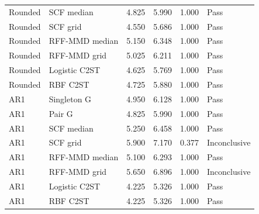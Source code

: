 {\begin{table}[t]
\begin{tabular}{llrrrl}
Rounded & SCF median & 4.825 & 5.990 & 1.000 & Pass \\
Rounded & SCF grid & 4.550 & 5.686 & 1.000 & Pass \\
Rounded & RFF-MMD median & 5.150 & 6.348 & 1.000 & Pass \\
Rounded & RFF-MMD grid & 5.025 & 6.211 & 1.000 & Pass \\
Rounded & Logistic C2ST & 4.625 & 5.769 & 1.000 & Pass \\
Rounded & RBF C2ST & 4.725 & 5.880 & 1.000 & Pass \\
AR1 & Singleton G & 4.950 & 6.128 & 1.000 & Pass \\
AR1 & Pair G & 4.825 & 5.990 & 1.000 & Pass \\
AR1 & SCF median & 5.250 & 6.458 & 1.000 & Pass \\
AR1 & SCF grid & 5.900 & 7.170 & 0.377 & Inconclusive \\
AR1 & RFF-MMD median & 5.100 & 6.293 & 1.000 & Pass \\
AR1 & RFF-MMD grid & 5.650 & 6.896 & 1.000 & Inconclusive \\
AR1 & Logistic C2ST & 4.225 & 5.326 & 1.000 & Pass \\
AR1 & RBF C2ST & 4.225 & 5.326 & 1.000 & Pass \\
\bottomrule
\end{tabular}
\end{table}
}

